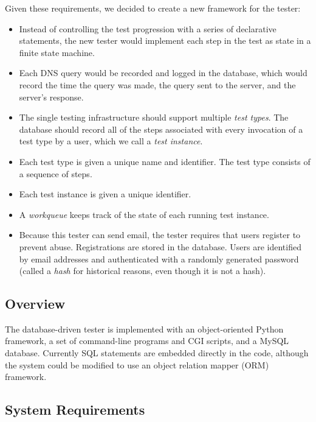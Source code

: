 \documentclass[preprint,3p]{elsarticle}
\begin{document}
\noindent Given these requirements, we decided to create a new framework for the
tester:

\begin{itemize}
\item Instead of controlling the test progression with a series of
  declarative statements, the new tester would implement each
  step in the test as state in a finite state machine. 
\item Each DNS query would be recorded and logged in the database,
  which would record the time the query was made, the query sent to
  the server, and the server's response. 
\item The single testing infrastructure should support multiple \emph{test
  types}. The database should record all of the steps associated with
  every invocation of a test type by a user, which we call a
  \emph{test instance}.
\item Each test type is given a unique name and identifier. The test type
  consists of a sequence of steps.
\item Each test instance is given a unique identifier. 
\item A \emph{workqueue} keeps track of the state of each running test instance.
\item Because this tester can send email, the tester requires that
  users register to prevent abuse. Registrations are stored in the
  database. Users are identified by email addresses and authenticated
  with a randomly generated password (called a \emph{hash} for
  historical reasons, even though it is not a hash). 
\end{itemize}

\subsection{Overview}
The database-driven tester is implemented with an object-oriented
Python framework, a set of command-line programs and CGI scripts, and
a MySQL database. Currently SQL statements are embedded directly in
the code, although the system could be modified to use an object
relation mapper (ORM) framework. 

\subsection{System Requirements}
\end{document}
